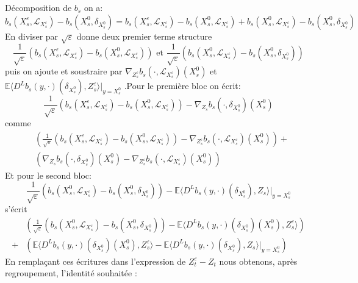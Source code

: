 \documentclass[12pt,a4paper,twoside,fleqn]{book}%
\theoremstyle{definition}
\theoremstyle{lemme}
\numberwithin{equation}{section}
\begin{document}
Décomposition de $b_s$ on a:
\[b_s(X_s^\varepsilon,\mathcal{L}_{X_s^\varepsilon})-b_s(X_s^0,\delta_{X_s^0})=b_s(X_s^\varepsilon,\mathcal{L}_{X_s^\varepsilon})-b_s(X_s^0,\mathcal{L}_{X_s^\varepsilon}) +b_s(X_s^0,\mathcal{L}_{X_s^\varepsilon})-b_s(X_s^0,\delta_{X_s^0})\] En diviser par $\sqrt{\varepsilon}$ donne deux premier terme structure
\begin{equation}\label{eq:2.2.32}
	\frac{1}{\sqrt{\varepsilon}}\left(b_s(X_s^\varepsilon,\mathcal{L}_{X_s^\varepsilon})-b_s(X_s^0,\mathcal{L}_{X_s^\varepsilon})\right) \text{ et }\frac{1}{\sqrt{\varepsilon}}\left(b_s(X_s^0,\mathcal{L}_{X_s^\varepsilon})-b_s(X_s^0,\delta_{X_s^0})\right)
\end{equation}
puis on ajoute et soustraire par $\nabla_{Z_s^\varepsilon}b_s(\cdot,\mathcal{L}_{X_s^\varepsilon})(X_s^0)$ et $\mathbb{E}\langle D^Lb_s(y,\cdot)(\delta_{X_s^0}),Z_s^\varepsilon\rangle|_{y=X_s^0}$
.Pour le première bloc on écrit:
\[
\frac{1}{\sqrt{\varepsilon}}\left(b_s(X_s^\varepsilon,\mathcal{L}_{X_s^\varepsilon})-b_s(X_s^0,\mathcal{L}_{X_s^\varepsilon})\right)-\nabla_{Z_s}b_s(\cdot,\delta_{X_s^0})(X_s^0)
\]
comme
\[\begin{aligned}
&\left(\frac{1}{\sqrt{\varepsilon}}\left(b_s(X_s^\varepsilon,\mathcal{L}_{X_s^\varepsilon})-b_s(X_s^0,\mathcal{L}_{X_s^\varepsilon})\right)-\nabla_{Z_s^\varepsilon}b_s(\cdot,\mathcal{L}_{X_s^\varepsilon})(X_s^0)\right) +\\ &\left(\nabla_{Z_s}b_s(\cdot,\delta_{X_s^0})(X_s^0) -\nabla_{Z_s^\varepsilon}b_s(\cdot,\mathcal{L}_{X_s^\varepsilon})(X_s^0) \right)
\end{aligned}
\]
Et pour le second bloc:
\[
\frac{1}{\sqrt{\varepsilon}}\left(b_s(X_s^0,\mathcal{L}_{X_s^\varepsilon})-b_s(X_s^0,\delta_{X_s^0})\right) - \mathbb{E}\langle D^Lb_s(y,\cdot)(\delta_{X_s^0}),Z_s\rangle|_{y=X_s^0}
\]
s'écrit
\[
\begin{aligned}
&\left(\frac{1}{\sqrt{\varepsilon}}\left(b_s(X_s^0,\mathcal{L}_{X_s^\varepsilon})-b_s(X_s^0,\delta_{X_s^0})\right)-\mathbb{E}\langle D^Lb_s(y,\cdot)(\delta_{X_s^0})(X_s^0),Z_s^\varepsilon\rangle\right)\\+
&\left(\mathbb{E}\langle D^Lb_s(y,\cdot)(\delta_{X_s^0})(X_s^0),Z_s^\varepsilon\rangle-\mathbb{E}\langle D^Lb_s(y,\cdot)(\delta_{X_s^0}),Z_s\rangle|_{y=X_s^0}\right)
\end{aligned}
\]
En remplaçant ces écritures dans l'expression de $ Z_t^\varepsilon-Z_t $ nous obtenons, après regroupement, l'identité souhaitée :
\end{document}
